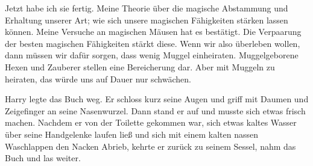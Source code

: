 \begin{buch}
Jetzt habe ich sie fertig. Meine Theorie über die magische Abstammung und Erhaltung unserer Art; wie sich unsere magischen Fähigkeiten stärken lassen können. Meine Versuche an magischen Mäusen hat es bestätigt. Die Verpaarung der besten magischen Fähigkeiten stärkt diese. Wenn wir also überleben wollen, dann müssen wir dafür sorgen, dass wenig Muggel einheiraten. Muggelgeborene Hexen und Zauberer stellen eine Bereicherung dar. Aber mit Muggeln zu heiraten, das würde uns auf Dauer nur schwächen.
\end{buch}


Harry legte das Buch weg. Er schloss kurz seine Augen und griff mit Daumen und Zeigefinger an seine Nasenwurzel. Dann stand er auf und musste sich etwas frisch machen. Nachdem er von der Toilette gekommen war, sich etwas kaltes Wasser über seine Handgelenke laufen ließ und sich mit einem kalten nassen Waschlappen den Nacken Abrieb, kehrte er zurück zu seinem Sessel, nahm das Buch und las weiter.

